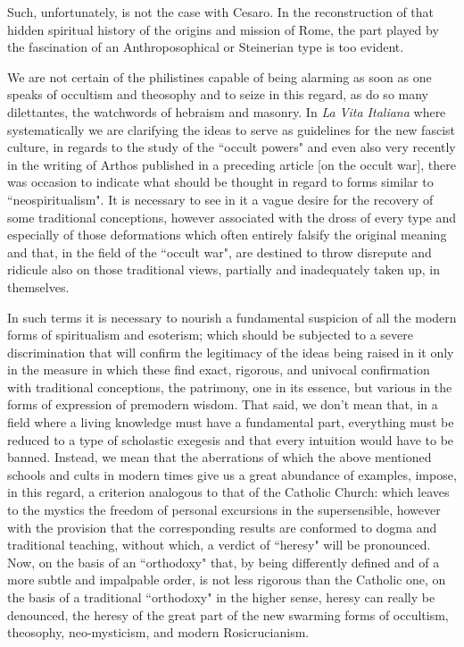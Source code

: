 Such, unfortunately, is not the case with Cesaro. In the reconstruction of that hidden spiritual history of the origins and mission of Rome, the part played by the fascination of an Anthroposophical or Steinerian type is too evident.

We are not certain of the philistines capable of being alarming as soon as one speaks of occultism and theosophy and to seize in this regard, as do so many dilettantes, the watchwords of hebraism and masonry. In \emph{La Vita Italiana} where systematically we are clarifying the ideas to serve as guidelines for the new fascist culture, in regards to the study of the ``occult powers" and even also very recently in the writing of Arthos published in a preceding article [on the occult war], there was occasion to indicate what should be thought in regard to forms similar to ``neospiritualism". It is necessary to see in it a vague desire for the recovery of some traditional conceptions, however associated with the dross of every type and especially of those deformations which often entirely falsify the original meaning and that, in the field of the ``occult war", are destined to throw disrepute and ridicule also on those traditional views, partially and inadequately taken up, in themselves.

In such terms it is necessary to nourish a fundamental suspicion of all the modern forms of spiritualism and esoterism; which should be subjected to a severe discrimination that will confirm the legitimacy of the ideas being raised in it only in the measure in which these find exact, rigorous, and univocal confirmation with traditional conceptions, the patrimony, one in its essence, but various in the forms of expression of premodern wisdom. That said, we don't mean that, in a field where a living knowledge must have a fundamental part, everything must be reduced to a type of scholastic exegesis and that every intuition would have to be banned. Instead, we mean that the aberrations of which the above mentioned schools and cults in modern times give us a great abundance of examples, impose, in this regard, a criterion analogous to that of the Catholic Church: which leaves to the mystics the freedom of personal excursions in the supersensible, however with the provision that the corresponding results are conformed to dogma and traditional teaching, without which, a verdict of ``heresy" will be pronounced. Now, on the basis of an ``orthodoxy" that, by being differently defined and of a more subtle and impalpable order, is not less rigorous than the Catholic one, on the basis of a traditional ``orthodoxy" in the higher sense, heresy can really be denounced, the heresy of the great part of the new swarming forms of occultism, theosophy, neo-mysticism, and modern Rosicrucianism.

